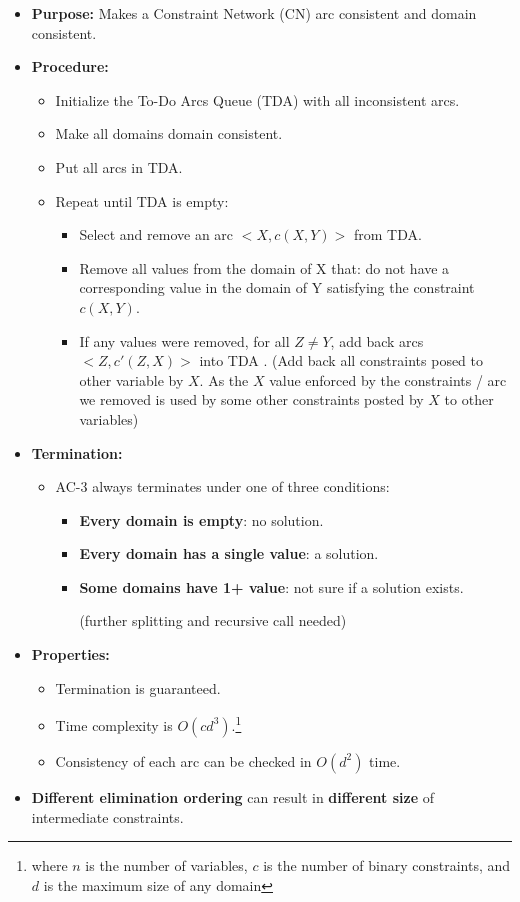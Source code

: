 \documentclass{article}
\theoremstyle{note}
\begin{document}
\begin{itemize}
  \begin{itemize}
  \item \textbf{Purpose:} Makes a Constraint Network (CN) arc consistent and domain consistent.
  \item \textbf{Procedure:}
  \begin{itemize}
    \item Initialize the To-Do Arcs Queue (TDA) with all inconsistent arcs.
    \item Make all domains domain consistent.
    \item Put all arcs in TDA.
    \item Repeat until TDA is empty:
    \begin{itemize}
      \item Select and remove an arc $<X, c(X,Y)>$ from TDA.
      \item Remove all values from the domain of X that:
      \subitem do not have a corresponding value in the domain of Y 
      \subitem satisfying the constraint $c(X,Y)$.
      \item If any values were removed, for all $Z \neq Y$, add back arcs $<Z, c'(Z,X)>$ into TDA .
       (Add back all constraints posed to other variable by $X$. As the $X$ value enforced by the constraints / arc we removed is used by some other constraints posted by $X$ to other variables)
    \end{itemize}
  \end{itemize}
  \item \textbf{Termination:}
  \begin{itemize}
    \item AC-3 always terminates under one of three conditions:
    \begin{itemize}
      \item \textbf{Every domain is empty}: no solution.
      \item \textbf{Every domain has a single value}: a solution.
      \item \textbf{Some domains have 1+ value}: not sure if a solution exists.
      
      (further splitting and recursive call needed)
    \end{itemize}
  \end{itemize}
  \item \textbf{Properties:}
  \begin{itemize}
    \item Termination is guaranteed.
    \item Time complexity is $O(cd^3)$.\footnote{where $n$ is the number of variables, $c$ is the number of binary constraints, and $d$ is the maximum size of any domain}
    \item Consistency of each arc can be checked in \( O(d^2) \) time.
  \end{itemize}
  \item \textbf{Different elimination ordering} can result in \textbf{different size} of intermediate constraints.
  

\end{itemize}
\end{itemize}
\end{document}
